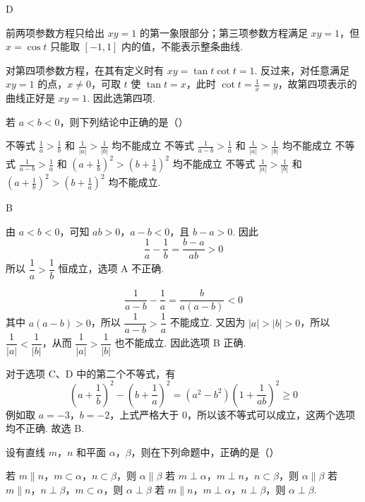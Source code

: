 \documentclass[UTF8,a4paper,oneside,11pt]{ctexbook}
\begin{document}
\begin{answer}
D
\end{answer}

\begin{solution}
前两项参数方程只给出 \(xy=1\) 的第一象限部分；第三项参数方程满足 \(xy=1\)，但 \(x=\cos t\) 只能取 \([-1,1]\) 内的值，不能表示整条曲线.

对第四项参数方程，在其有定义时有 \(xy=\tan t\cot t=1\). 反过来，对任意满足 \(xy=1\) 的点，\(x\ne0\)，可取 \(t\) 使 \(\tan t=x\)，此时 \(\cot t=\frac{1}{x}=y\)，故第四项表示的曲线正好是 \(xy=1\). 因此选第四项.
\end{solution}

\begin{problem}
若 \(a < b < 0\)，则下列结论中正确的是（\quad）

\choices
    {不等式 \(\frac{1}{a} > \frac{1}{b}\) 和 \(\frac{1}{|a|} > \frac{1}{|b|}\) 均不能成立}
    {不等式 \(\frac{1}{a - b} > \frac{1}{a}\) 和 \(\frac{1}{|a|} > \frac{1}{|b|}\) 均不能成立}
    {不等式 \(\frac{1}{a - b} > \frac{1}{a}\) 和 \(\left(a + \frac{1}{b}\right)^2 > \left(b + \frac{1}{a}\right)^2\) 均不能成立}
    {不等式 \(\frac{1}{|a|} > \frac{1}{|b|}\) 和 \(\left(a + \frac{1}{b}\right)^2 > \left(b + \frac{1}{a}\right)^2\) 均不能成立.}
\end{problem}

\begin{answer}
B
\end{answer}

\begin{solution}
由 \(a<b<0\)，可知 \(ab>0\)，\(a-b<0\)，且 \(b-a>0\). 因此
\[
\frac1a-\frac1b=\frac{b-a}{ab}>0
\]
所以 \(\dfrac1a>\dfrac1b\) 恒成立，选项 A 不正确.

\[
\frac1{a-b}-\frac1a=\frac{b}{a(a-b)}<0
\]
其中 \(a(a-b)>0\)，所以 \(\dfrac1{a-b}>\dfrac1a\) 不能成立. 又因为
\(|a|>|b|>0\)，所以 \(\dfrac1{|a|}<\dfrac1{|b|}\)，从而 \(\dfrac1{|a|}>\dfrac1{|b|}\) 也不能成立. 因此选项 B 正确.

对于选项 C、D 中的第二个不等式，有
\[
\left(a+\frac1b\right)^2-\left(b+\frac1a\right)^2
=(a^2-b^2)\left(1+\frac1{ab}\right)^2\ge0
\]
例如取 \(a=-3\)，\(b=-2\)，上式严格大于 \(0\)，所以该不等式可以成立，这两个选项均不正确. 故选 B.
\end{solution}

\begin{problem}
设有直线 \(m\)，\(n\) 和平面 \(\alpha\)，\(\beta\)，则在下列命题中，正确的是（\quad）

\choices
    {若 \(m \parallel n\)，\(m \subset \alpha\)，\(n \subset \beta\)，则 \(\alpha \parallel \beta\)}
    {若 \(m \perp \alpha\)，\(m \perp n\)，\(n \subset \beta\)，则 \(\alpha \parallel \beta\)}
    {若 \(m \parallel n\)，\(n \perp \beta\)，\(m \subset \alpha\)，则 \(\alpha \perp \beta\)}
    {若 \(m \parallel n\)，\(m \perp \alpha\)，\(n \perp \beta\)，则 \(\alpha \perp \beta\).}
\end{problem}
\end{document}

